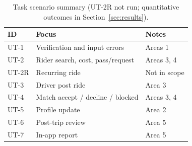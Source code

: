 \begin{table}[htbp]
  \centering
  \caption{Task scenario summary (UT-2R not run; quantitative outcomes in Section~\ref{sec:results}).}
  \label{tab:task_summary}
  \begin{tabular}{lll}
    \toprule
    \textbf{ID} & \textbf{Focus} & \textbf{Notes}\\
    \midrule
    UT-1 & Verification and input errors & Areas 1\\
    UT-2 & Rider search, cost, pass/request & Areas 3, 4\\
    UT-2R & Recurring ride & Not in scope\\
    UT-3 & Driver post ride & Area 3\\
    UT-4 & Match accept / decline / blocked & Areas 3, 4\\
    UT-5 & Profile update & Area 2\\
    UT-6 & Post-trip review & Area 5\\
    UT-7 & In-app report & Area 5\\
    \bottomrule
  \end{tabular}
\end{table}
